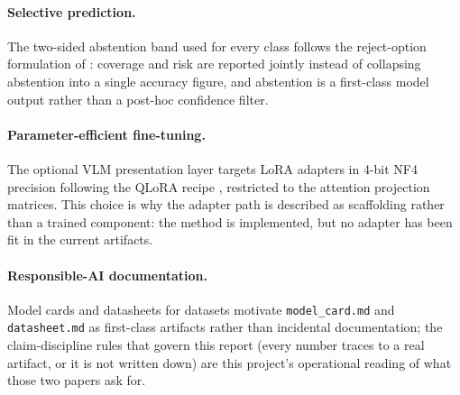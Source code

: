 \paragraph{Selective prediction.} The two-sided abstention band used for every class
follows the reject-option formulation of \citet{geifman2017selective}: coverage and risk
are reported jointly instead of collapsing abstention into a single accuracy figure,
and abstention is a first-class model output rather than a post-hoc confidence filter.

\paragraph{Parameter-efficient fine-tuning.} The optional VLM presentation layer targets
LoRA adapters \citep{hu2022lora} in 4-bit NF4 precision following the QLoRA recipe
\citep{dettmers2023qlora}, restricted to the attention projection matrices. This choice
is why the adapter path is described as scaffolding rather than a trained component:
the method is implemented, but no adapter has been fit in the current artifacts.

\paragraph{Responsible-AI documentation.} Model cards \citep{mitchell2019modelcards} and
datasheets for datasets \citep{gebru2018datasheets} motivate \texttt{model\_card.md} and
\texttt{datasheet.md} as first-class artifacts rather than incidental documentation;
the claim-discipline rules that govern this report (every number traces to a real
artifact, or it is not written down) are this project's operational reading of what
those two papers ask for.
